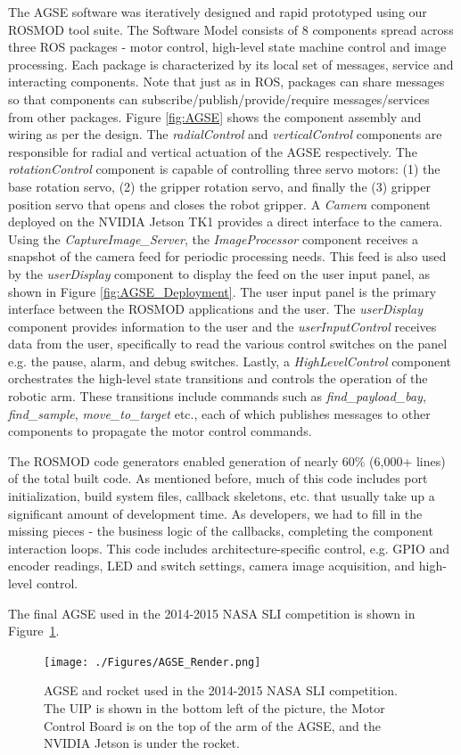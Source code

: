 The AGSE software was iteratively designed and rapid prototyped using
our ROSMOD tool suite. The Software Model consists of 8 components
spread across three ROS packages - motor control, high-level state
machine control and image processing. Each package is characterized by
its local set of messages, service and interacting components. Note
that just as in ROS, packages can share messages so that components
can subscribe/publish/provide/require messages/services from other
packages. Figure \ref{fig:AGSE} shows the component assembly and
wiring as per the design. The \emph{radialControl} and
\emph{verticalControl} components are responsible for radial and
vertical actuation of the AGSE respectively. The
\emph{rotationControl} component is capable of controlling three servo
motors: (1) the base rotation servo, (2) the gripper rotation servo,
and finally the (3) gripper position servo that opens and closes the
robot gripper. A \emph{Camera} component deployed on the NVIDIA Jetson
TK1 provides a direct interface to the camera. Using the
\emph{CaptureImage\_Server}, the \emph{ImageProcessor} component
receives a snapshot of the camera feed for periodic processing
needs. This feed is also used by the \emph{userDisplay} component to
display the feed on the user input panel, as shown in Figure
\ref{fig:AGSE_Deployment}. The user input panel is the primary
interface between the ROSMOD applications and the user. The
\emph{userDisplay} component provides information to the user and the
\emph{userInputControl} receives data from the user, specifically to
read the various control switches on the panel e.g. the pause, alarm,
and debug switches. Lastly, a \emph{HighLevelControl} component
orchestrates the high-level state transitions and controls the
operation of the robotic arm. These transitions include commands such
as \emph{find\_payload\_bay}, \emph{find\_sample},
\emph{move\_to\_target} etc., each of which publishes messages to
other components to propagate the motor control commands.

The ROSMOD code generators enabled generation of nearly 60\% (6,000+
lines) of the total built code. As mentioned before, much of this code
includes port initialization, build system files, callback skeletons,
etc. that usually take up a significant amount of development time. As
developers, we had to fill in the missing pieces - the business logic
of the callbacks, completing the component interaction loops. This
code includes architecture-specific control, e.g. GPIO and encoder
readings, LED and switch settings, camera image acquisition, and
high-level control.

The final AGSE used in the 2014-2015 NASA SLI competition is shown in
Figure~\ref{fig:competition_AGSE}.

\begin{figure}[h]
	\centering
        \texttt{[image: ./Figures/AGSE\_Render.png]}
	\caption{AGSE and rocket used in the 2014-2015 NASA SLI
          competition.  The UIP is shown in the bottom left of the
          picture, the Motor Control Board is on the top of the arm of
          the AGSE, and the NVIDIA Jetson is under the rocket.}
	\label{fig:competition_AGSE}
\end{figure}

